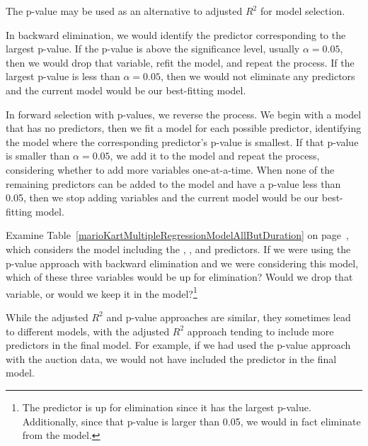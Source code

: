 The p-value may be used as an alternative to adjusted $R^2$ for model selection.

In backward elimination, we would identify the predictor corresponding to the largest p-value. If the p-value is above the significance level, usually $\alpha = 0.05$, then we would drop that variable, refit the model, and repeat the process. If the largest p-value is less than $\alpha = 0.05$, then we would not eliminate any predictors and the current model would be our best-fitting model.

In forward selection with p-values, we reverse the process. We begin with a model that has no predictors, then we fit a model for each possible predictor, identifying the model where the corresponding predictor's p-value is smallest. If that p-value is smaller than $\alpha = 0.05$, we add it to the model and repeat the process, considering whether to add more variables one-at-a-time. When none of the remaining predictors can be added to the model and have a p-value less than 0.05, then we stop adding variables and the current model would be our best-fitting model.

\begin{exercise}
Examine Table~\ref{marioKartMultipleRegressionModelAllButDuration} on page~\pageref{marioKartMultipleRegressionModelAllButDuration}, which considers the model including the , , and  predictors. If we were using the p-value approach with backward elimination and we were considering this model, which of these three variables would be up for elimination? Would we drop that variable, or would we keep it in the model?\footnote{The  predictor is up for elimination since it has the largest p-value. Additionally, since that p-value is larger than 0.05, we would in fact eliminate  from the model.}
\end{exercise}

While the adjusted $R^2$ and p-value approaches are similar, they sometimes lead to different models, with the adjusted $R^2$ approach tending to include more predictors in the final model. For example, if we had used the p-value approach with the auction data, we would not have included the  predictor in the final model.

